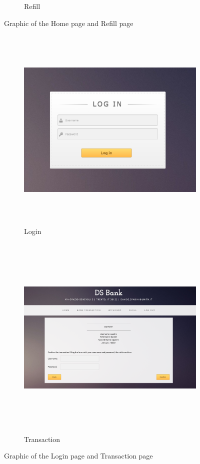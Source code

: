 \documentclass[a4paper]{article}
\begin{document}
\begin{figure}[h]
\begin{subfigure}{0.5\textwidth}
    \caption{Refill}
    \label{fig:refill}
  \end{subfigure}
  \caption{Graphic of the Home page and Refill page}
  \label{fig:gui1}
\end{figure}

\begin{figure}[h]
  \begin{subfigure}{0.5\textwidth}
    \includegraphics[keepaspectratio=true, width=0.9\linewidth, height=10cm]{login}
    \caption{Login}
    \label{fig:login}
  \end{subfigure}
  \begin{subfigure}{0.5\textwidth}
    \includegraphics[keepaspectratio=true, width=0.9\linewidth, height=10cm]{transaction} 
    \caption{Transaction}
    \label{fig:transaction}
  \end{subfigure}
  \caption{Graphic of the Login page and Transaction page}
  \label{fig:gui2}
\end{figure}
\end{document}
